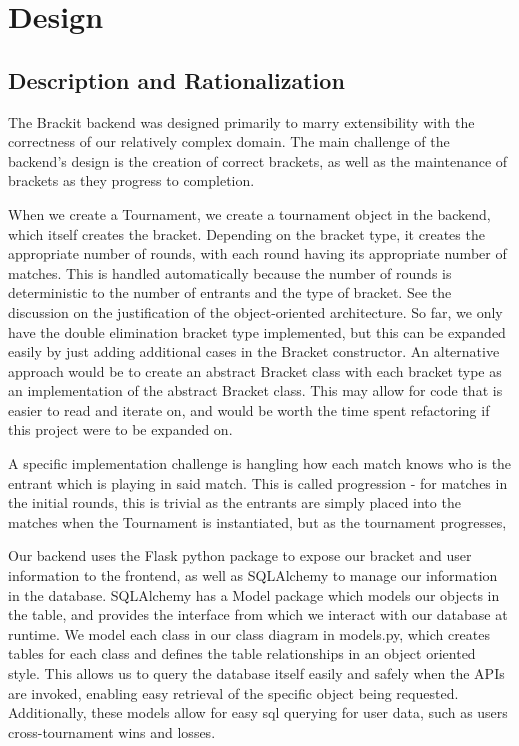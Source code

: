 \documentclass{article}
\begin{document}
\section{Design}
\subsection{Description and Rationalization}
The Brackit backend was designed primarily to marry extensibility with the correctness of 
our relatively complex domain. The main challenge of the backend's design is the creation of 
correct brackets, as well as the maintenance of brackets as they progress to completion.

When we create a Tournament, we create a tournament object in the backend, which itself creates
the bracket. Depending on the bracket type, it creates the appropriate number of rounds, 
with each round having its appropriate number of matches. This is handled automatically because
the number of rounds is deterministic to the number of entrants and the type of bracket. See the discussion
on the justification of the object-oriented architecture.
So far, we only have the double elimination bracket type implemented, but this can be expanded easily by just adding additional 
cases in the Bracket constructor. An alternative approach would be to create an abstract Bracket
class with each bracket type as an implementation of the abstract Bracket class. This may allow for 
code that is easier to read and iterate on, and would be worth the time spent refactoring if this project were 
to be expanded on.

A specific implementation challenge is hangling how each match knows who is the entrant which is playing 
in said match. This is called progression - for matches in the initial rounds, this is trivial as 
the entrants are simply placed into the matches when the Tournament is instantiated, but as the tournament
progresses, 

Our backend uses the Flask python package to expose our bracket and user information to 
the frontend, as well as SQLAlchemy to manage our information in the database. SQLAlchemy has a 
Model package which models our objects in the table, and provides the interface from which we interact
with our database at runtime. We model each class in our class diagram in models.py, which creates 
tables for each class and defines the table relationships in an object oriented style. This 
allows us to query the database itself easily and safely when the APIs are invoked, enabling 
easy retrieval of the specific object being requested. Additionally, these models allow for 
easy sql querying for user data, such as users cross-tournament wins and losses. 
\end{document}
